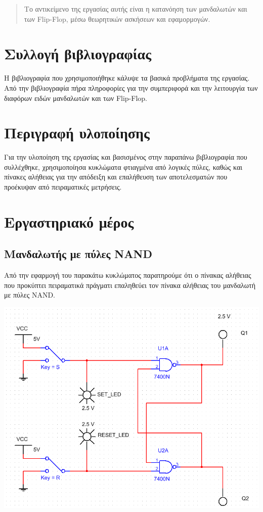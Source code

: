 \documentclass{article}
\begin{document}
\begin{titlepage}
\maketitle
\end{titlepage}

\renewcommand{\contentsname}{Περιεχόμενα}
\tableofcontents

\renewcommand{\abstractname}{Εισαγωγή}
\begin{abstract}
	Το αντικείμενο της εργασίας αυτής είναι η κατανόηση των μανδαλωτών
	και των Flip-Flop, μέσω θεωρητικών ασκήσεων και εφαμορμογών.
\end{abstract}
\pagebreak

\section{Συλλογή βιβλιογραφίας}
Η βιβλιογραφία που χρησιμοποιήθηκε κάλυψε τα βασικά προβλήματα
της εργασίας. Από την βιβλιογραφία πήρα πληροφορίες για την συμπεριφορά 
και την λειτουργία των διαφόρων ειδών μανδαλωτών και των Flip-Flop.

\section{Περιγραφή υλοποίησης}
Για την υλοποίηση της εργασίας και βασισμένος στην παραπάνω βιβλιογραφία
που συλλέχθηκε, χρησιμοποίησα κυκλώματα φτιαγμένα από λογικές πύλες, καθώς
και πίνακες αλήθειας για την απόδειξη και επαλήθευση των αποτελεσματών
που προέκυψαν από πειραματικές μετρήσεις.

\section{Εργαστηριακό μέρος}
\subsection{Μανδαλωτής με πύλες NAND}
Από την εφαρμογή του παρακάτω κυκλώματος παρατηρούμε ότι
ο πίνακας αλήθειας που προκύπτει πειραματικά πράγματι
επαληθεύει τον πίνακα αλήθειας του μανδαλωτή με πύλες NAND.

\includegraphics[width=\textwidth]{./res/ffnand.png}
\end{document}
